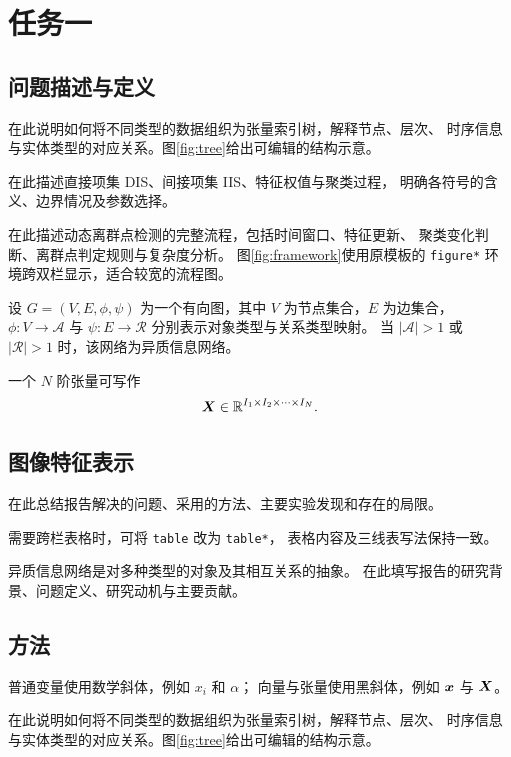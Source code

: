 \documentclass[sigconf,nonacm,screen]{acmart}
\begin{document}
\section{任务一}
\label{sec:task1}
\subsection{问题描述与定义}
\label{sec:task1-problem}
在此说明如何将不同类型的数据组织为张量索引树，解释节点、层次、
时序信息与实体类型的对应关系。图\ref{fig:tree}给出可编辑的结构示意。

在此描述直接项集 DIS、间接项集 IIS、特征权值与聚类过程，
明确各符号的含义、边界情况及参数选择。

在此描述动态离群点检测的完整流程，包括时间窗口、特征更新、
聚类变化判断、离群点判定规则与复杂度分析。
图\ref{fig:framework}使用原模板的 \texttt{figure*} 环境跨双栏显示，适合较宽的流程图。

\begin{reportdefinition}[异质信息网络]
设 $G=(V,E,\phi,\psi)$ 为一个有向图，其中 $V$ 为节点集合，$E$ 为边集合，
$\phi:V\to\mathcal A$ 与 $\psi:E\to\mathcal R$ 分别表示对象类型与关系类型映射。
当 $|\mathcal A|>1$ 或 $|\mathcal R|>1$ 时，该网络为异质信息网络。
\end{reportdefinition}

一个 $N$ 阶张量可写作
\begin{equation}
  \bm{X}\in\mathbb R^{I_1\times I_2\times\cdots\times I_N}.
  \label{eq:tensor}
\end{equation}

\subsection{图像特征表示}
\label{sec:task1-feature}
在此总结报告解决的问题、采用的方法、主要实验发现和存在的局限。

需要跨栏表格时，可将 \texttt{table} 改为 \texttt{table*}，
表格内容及三线表写法保持一致。

异质信息网络是对多种类型的对象及其相互关系的抽象。
在此填写报告的研究背景、问题定义、研究动机与主要贡献。

\subsection{方法}
\label{sec:task1-method}
普通变量使用数学斜体，例如 $x_i$ 和 $\alpha$；
向量与张量使用黑斜体，例如 $\bm{x}$ 与 $\bm{X}$。

在此说明如何将不同类型的数据组织为张量索引树，解释节点、层次、
时序信息与实体类型的对应关系。图\ref{fig:tree}给出可编辑的结构示意。
\end{document}
